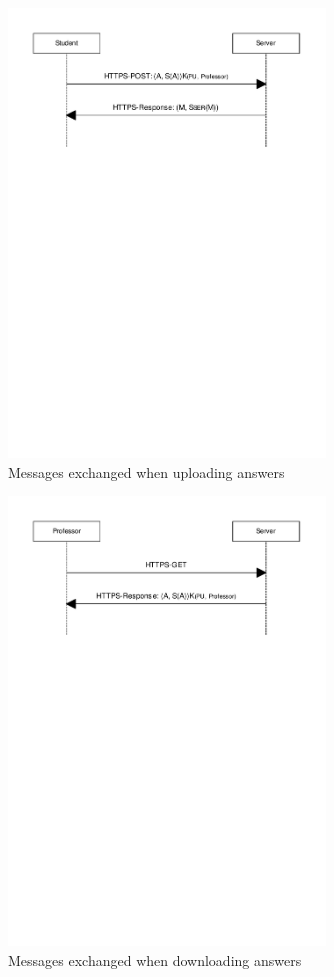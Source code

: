 \documentclass{article}
\begin{document}
\begin{figure}
  \begin{center}
  \includegraphics[width=0.75\textwidth]{images/upload_answers.pdf}
  \caption{Messages exchanged when uploading answers}
  \label{fig:upload-answers}
  \end{center}
\end{figure}

\begin{figure}
  \begin{center}
  \includegraphics[width=0.75\textwidth]{images/download_answers.pdf}
  \caption{Messages exchanged when downloading answers}
  \label{fig:download-answers}
  \end{center}
\end{figure}
\end{document}

